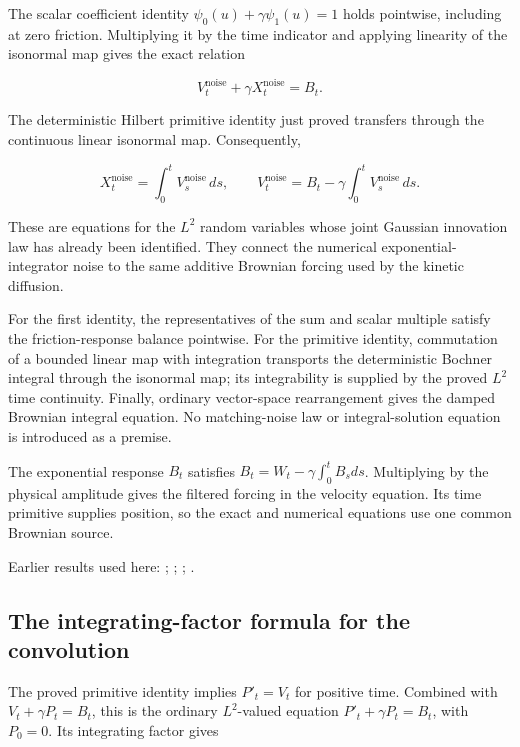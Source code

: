 \documentclass[11pt,a4paper]{report}
\begin{document}
The scalar coefficient identity \(\psi_0(u)+\gamma\psi_1(u)=1\) holds pointwise, including at zero friction. Multiplying it by the time indicator and applying linearity of the isonormal map gives the exact relation

\[V_t^{\mathrm{noise}}+\gamma X_t^{\mathrm{noise}}=B_t.\]

The deterministic Hilbert primitive identity just proved transfers through the continuous linear isonormal map. Consequently,

\[X_t^{\mathrm{noise}}=\int_0^tV_s^{\mathrm{noise}}\,ds,\qquad V_t^{\mathrm{noise}}=B_t-\gamma\int_0^tV_s^{\mathrm{noise}}\,ds.\]

These are equations for the \(L^{2}\) random variables whose joint Gaussian innovation law has already been identified. They connect the numerical exponential-integrator noise to the same additive Brownian forcing used by the kinetic diffusion.



For the first identity, the representatives of the sum and scalar multiple satisfy the friction-response balance pointwise. For the primitive identity, commutation of a bounded linear map with integration transports the deterministic Bochner integral through the isonormal map; its integrability is supplied by the proved \(L^{2}\) time continuity. Finally, ordinary vector-space rearrangement gives the damped Brownian integral equation. No matching-noise law or integral-solution equation is introduced as a premise.



The exponential response \(B_t\) satisfies \(B_t=W_t-\gamma\int_0^tB_sds\). Multiplying by the physical amplitude gives the filtered forcing in the velocity equation. Its time primitive supplies position, so the exact and numerical equations use one common Brownian source.



Earlier results used here: \cite[Section~3.6.12]{LangevinLean2026ULASC}; \cite[Section~3.8.2]{LangevinLean2026ULASC}; \cite[Section~3.8.5]{LangevinLean2026ULASC}; \cite[Section~3.8.9]{LangevinLean2026ULASC}.
\subsection{\texorpdfstring{The integrating-factor formula for the convolution}{The integrating-factor formula for the convolution}}
\label{report-step-KineticLangevin-BrownianConvolution-lean-10}


The proved primitive identity implies \(P'_t=V_t\) for positive time. Combined with \(V_t+\gamma P_t=B_t\), this is the ordinary \(L^{2}\)-valued equation \(P'_t+\gamma P_t=B_t\), with \(P_0=0\). Its integrating factor gives
\end{document}
